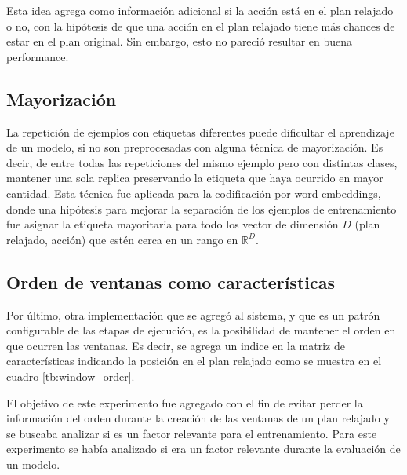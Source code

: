 Esta idea agrega como información adicional si la acción está en el plan
relajado o no, con la hipótesis de que una acción en el plan relajado tiene más
chances de estar en el plan original. Sin embargo, esto no pareció resultar en
buena performance.

\subsection{Mayorización}

La repetición de ejemplos con etiquetas diferentes puede dificultar el
aprendizaje de un modelo, si no son preprocesadas con alguna técnica de
mayorización. Es decir, de entre todas las repeticiones del mismo ejemplo pero
con distintas clases, mantener una sola replica preservando la etiqueta que haya
ocurrido en mayor cantidad. Esta técnica fue aplicada para la codificación por
word embeddings, donde una hipótesis para mejorar la separación de los ejemplos
de entrenamiento fue asignar la etiqueta mayoritaria para todo los vector de
dimensión $D$ (plan relajado, acción) que estén cerca en un rango en
$\mathbb{R}^{D}$.

\subsection{Orden de ventanas como características}

Por último, otra implementación que se agregó al sistema, y que es un patrón
configurable de las etapas de ejecución, es la posibilidad de mantener el orden
en que ocurren las ventanas. Es decir, se agrega un indice en la matriz de
características indicando la posición en el plan relajado como se muestra en el
cuadro \ref{tb:window_order}.

\begin{table}[h!]
\centering
{}
 \caption{Ejemplos etiquetados a partir de un plan relajado y una acción}
 \label{tb:window_order}
\end{table}

El objetivo de este experimento fue agregado con el fin de evitar perder la
información del orden durante la creación de las ventanas de un plan relajado y
se buscaba analizar si es un factor relevante para el entrenamiento. Para este
experimento se había analizado si era un factor relevante durante la evaluación
de un modelo.